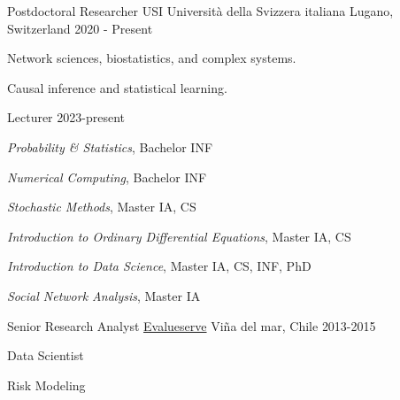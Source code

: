 

\begin{cventries}

\cventry
    {Postdoctoral Researcher}
    {USI Università della Svizzera italiana} %
    {Lugano, Switzerland} %
    {2020 - Present} %
    {
      \begin{cvitems} %
        \item {Network sciences, biostatistics, and complex systems.}
        \item {Causal inference and statistical learning.}
      \end{cvitems}
    }

\cventry
    {Lecturer} %
    { } %
    {} %
    {2023-present} %
{
  \begin{cvitems} %
    \item {\emph{Probability \& Statistics}, Bachelor INF}
    \item {\emph{Numerical Computing}, Bachelor INF}
    \item {\emph{Stochastic Methods}, Master IA, CS}
    \item {\emph{Introduction to Ordinary Differential Equations}, Master IA, CS}
    \item {\emph{Introduction to Data Science}, Master IA, CS, INF, PhD}
    \item {\emph{Social Network Analysis}, Master IA}
  \end{cvitems}
}



\cventry
{Senior Research Analyst} %
{\href{www.evalueserve.com}{Evalueserve}} %
{Vi\~na del mar, Chile} %
{2013-2015} %
{
	\begin{cvitems} %
		\item Data Scientist
        \item Risk Modeling
	\end{cvitems}
}


\end{cventries}
